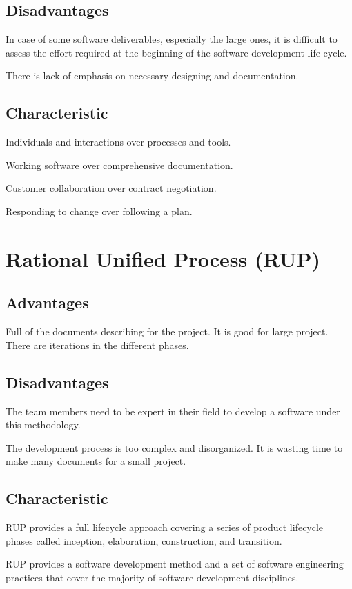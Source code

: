 \subsection*{Disadvantages}
In case of some software deliverables, especially the large ones, it is difficult to assess the effort required at the beginning of the software development life cycle.

There is lack of emphasis on necessary designing and documentation.


\subsection*{Characteristic}
Individuals and interactions over processes and tools. 

Working software over comprehensive documentation.

Customer collaboration over contract negotiation.

Responding to change over following a plan.


\section*{Rational Unified Process (RUP)}

\subsection*{Advantages}
Full of the documents describing for the project. It is good for large project. There are iterations in the different phases. 


\subsection*{Disadvantages}
The team members need to be expert in their field to develop a software under this methodology.

The development process is too complex and disorganized.
It is wasting time to make many documents for a small project.


\subsection*{Characteristic}
RUP provides a full lifecycle approach covering a series of product lifecycle phases called inception, elaboration, construction, and transition.

RUP provides a software development method and a set of software engineering practices that cover the majority of software development disciplines.

